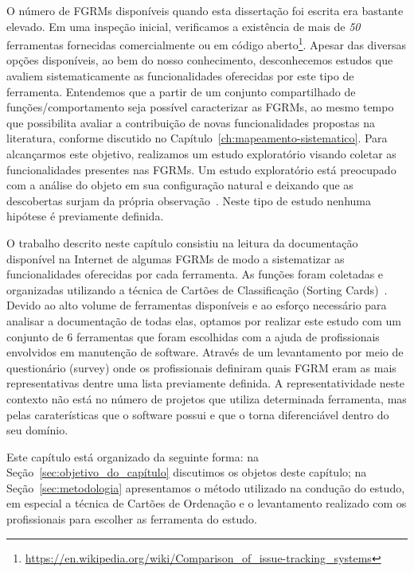O número de FGRMs disponíveis quando esta dissertação foi escrita era bastante
elevado. Em uma inspeção inicial, verificamos a existência de mais de
\textit{50} ferramentas fornecidas comercialmente ou em código
aberto\footnote{\url{https://en.wikipedia.org/wiki/Comparison_of_issue-tracking_systems}}.
Apesar das diversas opções disponíveis, ao bem do nosso conhecimento,
desconhecemos estudos que avaliem sistematicamente as funcionalidades oferecidas
por este tipo de ferramenta. Entendemos que a partir de um conjunto
compartilhado de funções/comportamento seja possível caracterizar as FGRMs, ao
mesmo tempo que possibilita avaliar a contribuição de novas funcionalidades
propostas na li\-te\-ra\-tu\-ra, conforme discutido no
Capítulo~\ref{ch:mapeamento-sistematico}. Para alcançarmos este objetivo,
realizamos um estudo exploratório visando coletar as funcionalidades presentes
nas FGRMs. Um estudo exploratório está preocupado com a análise do objeto em
sua configuração natural e deixando que as descobertas surjam da própria
observação~\cite{wohlin2012experimentation}. Neste tipo de estudo nenhuma
hipótese é previamente definida.

O trabalho descrito neste capítulo consistiu na leitura da documentação
disponível na Internet de algumas FGRMs de modo a sistematizar as
funcionalidades o\-fe\-re\-ci\-das por cada ferramenta. As funções foram
coletadas e organizadas utilizando a técnica de Cartões de Classificação
(Sorting Cards)~\cite{5070993, rugg2005sorting}. Devido ao alto volume de
ferramentas disponíveis e ao esforço necessário para analisar a documentação de
todas elas, optamos por realizar este estudo com um conjunto de 6 ferramentas
que foram escolhidas com a ajuda de profissionais envolvidos em manutenção de
software. Através de um levantamento por meio de questionário (survey) onde os
profissionais definiram quais FGRM eram as mais representativas dentre uma lista
previamente definida. A representatividade neste contexto não está no número de
projetos que utiliza determinada ferramenta, mas pelas caraterísticas que o
software possui e que o torna diferenciável dentro do seu domínio.


Este capítulo está organizado da seguinte forma: na
Seção~\ref{sec:objetivo_do_capítulo} discutimos os objetos deste capítulo; na
Seção~\ref{sec:metodologia} apresentamos o método utilizado na condução do
estudo, em especial a técnica de Cartões de Ordenação e o levantamento realizado
com os profissionais para escolher as ferramenta do estudo.

